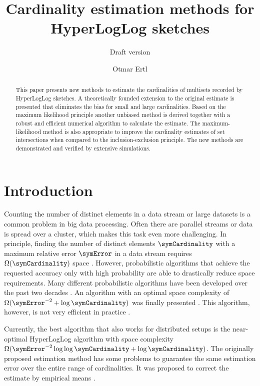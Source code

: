 \documentclass[a4paper]{scrartcl}
\title{Cardinality estimation methods for HyperLogLog sketches}
\subtitle{Draft version}
\author{Otmar Ertl}
\begin{document}
\maketitle
\begin{abstract}
This paper presents new methods to estimate the cardinalities of multisets recorded by HyperLogLog sketches. A theoretically founded extension to the original estimate is presented that eliminates the bias for small and large cardinalities. Based on the maximum likelihood principle another unbiased method is derived together with a robust and efficient numerical algorithm to calculate the estimate. The maximum-likelihood method is also appropriate to improve the cardinality estimates of set intersections when compared to the inclusion-exclusion principle. The new methods are demonstrated and verified by extensive simulations.
\end{abstract}

\section{Introduction}
Counting the number of distinct elements in a data stream or large datasets is a common problem in big data processing. Often there are parallel streams  or data is spread over a cluster, which makes this task even more challenging.
In principle, finding the number of distinct elements $\symCardinality$ with a maximum relative error $\symError$  in a data stream requires $\Omega(\symCardinality)$ space \cite{Alon1999}. However, probabilistic algorithms that achieve the requested accuracy only with high probability are able to drastically reduce space requirements. Many different probabilistic algorithms have been developed over the past two decades \cite{Metwally2008,Ting2014}. An algorithm with an optimal space complexity of $\Omega(\symError^{-2}+\log \symCardinality)$ \cite{Alon1999, Indyk2003} was finally presented \cite{Kane2010}. This algorithm, however, is not very efficient in practice \cite{Ting2014}.

Currently, the best algorithm that also works for distributed setups is the near-optimal HyperLogLog algorithm \cite{Flajolet2007} with space complexity $\Omega(\symError^{-2} \log\log\symCardinality +\log \symCardinality)$. The originally proposed estimation method has some problems to guarantee the same estimation error over the entire range of cardinalities. It was proposed to correct the estimate by empirical means \cite{Heule2013,Rhodes2015,Sanfilippo2014}. 
\end{document}
